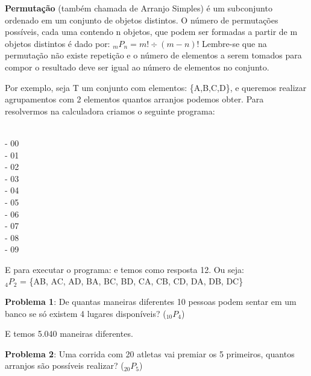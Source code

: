 \textbf{Permutação} (também chamada de Arranjo Simples) é um subconjunto ordenado em um conjunto de objetos distintos. O número de permutações possíveis, cada uma contendo n objetos, que podem ser formadas a partir de m objetos distintos é dado por: $_mP_n = m! \div (m - n)!$ Lembre-se que na permutação não existe repetição e o número de elementos a serem tomados para compor o resultado deve ser igual ao número de elementos no conjunto.

Por exemplo, seja T um conjunto com elementos: \{A,B,C,D\}, e queremos realizar agrupamentos com 2 elementos quantos arranjos podemos obter. Para resolvermos na calculadora criamos o seguinte programa:

  \\
  - 00 \\
  - 01 \\
 - 02 \\
  - 03 \\
  - 04 \\
  - 05 \\
\keystroke{$-$} - 06 \\
  - 07 \\
\keystroke{$\div$} - 08 \\
    - 09 \\
 

E para executar o programa:     e temos como resposta 12. Ou seja: \\
$_4P_2$ = \{AB, AC, AD, BA, BC, BD, CA, CB, CD, DA, DB, DC\}

\textbf{Problema 1}: De quantas maneiras diferentes 10 pessoas podem sentar em um banco se só existem 4 lugares disponíveis? ($_{10}P_4$)

    

E temos 5.040 maneiras diferentes.

\textbf{Problema 2}: Uma corrida com 20 atletas vai premiar os 5 primeiros, quantos arranjos são possíveis realizar? ($_{20}P_5$)

    

